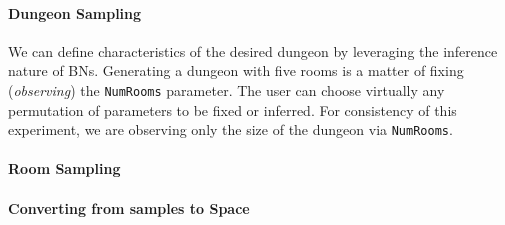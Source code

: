 \documentclass{UoYCSproject}
\begin{document}
\paragraph{Dungeon Sampling} %
We can define characteristics of the desired dungeon by leveraging the inference nature of BNs. Generating a dungeon with five rooms is a matter of fixing (\textit{observing}) the \texttt{NumRooms} parameter. The user can choose virtually any permutation of parameters to be fixed or inferred. For consistency of this experiment, we are observing only the size of the dungeon via \texttt{NumRooms}.

\paragraph{Room Sampling}

\paragraph{Converting from samples to Space}
\end{document}
